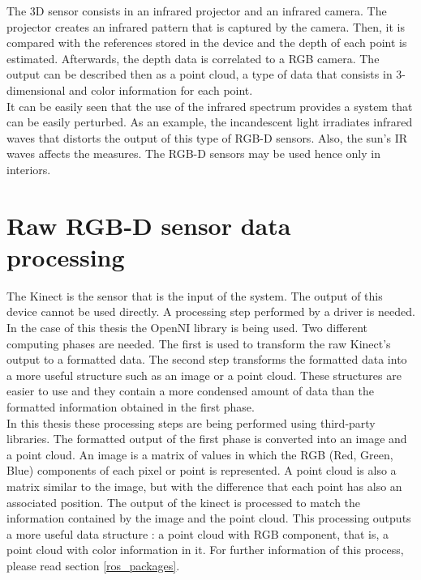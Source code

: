 \label{rgb-d}

The 3D sensor consists in an infrared projector and an infrared camera. 
The projector creates an infrared pattern that is captured by the camera.
Then, it is compared with the references stored in the device and the depth of each point is estimated. 
Afterwards, the depth data is correlated to a RGB camera. 
The output can be described then as a point cloud, a type of data that consists in 3-dimensional and color information for each point.  
\\

It can be easily seen that the use of the infrared spectrum provides a system that can be easily perturbed. 
As an example, the incandescent light irradiates infrared waves that distorts the output of this type of RGB-D sensors. 
Also, the sun's IR waves affects the measures. 
The RGB-D sensors may be used hence only in interiors. 




\section{Raw RGB-D sensor data processing}
\label{input_data}
The Kinect is the sensor that is the input of the system. 
The output of this device cannot be used directly. 
A processing step performed by a driver is needed. 
In the case of this thesis the OpenNI library is being used. 
Two different computing phases are needed. 
The first is used to transform the raw Kinect's output to a formatted data. 
The second step transforms the formatted data into a more useful structure such as an image or a point cloud. 
These structures are easier to use and they contain a more condensed amount of data than the formatted information obtained in the first phase. 
\\

In this thesis these processing steps are being performed using third-party libraries. 
The formatted output of the first phase is converted into an image and a point cloud. 
An image is a matrix of values in which the RGB (Red, Green, Blue) components of each pixel or point is represented. 
A point cloud is also a matrix similar to the image, but with the difference that each point has also an associated position. 
The output of the kinect is processed to match the information contained by the image and the point cloud. 
This processing outputs a more useful data structure : a point cloud with RGB component, that is, a point cloud with color information in it. 
For further information of this process, please read section \ref{ros_packages}.


